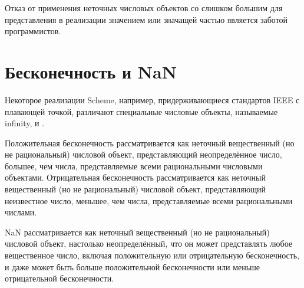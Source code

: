 Отказ от применения неточных числовых объектов со слишком большим для представления в
реализации значением или значащей частью является заботой программистов.\vspace{-6mm}

\section{Бесконечность и NaN}\vspace{-4mm}

Некоторое реализации Scheme, например, придерживающиеся стандартов IEEE с плавающей
точкой, различают специальные числовые объекты, называемые \mainindex
{infinity},  и
.

Положительная бесконечность рассматривается как неточный вещественный (но не рациональный)
числовой объект, представляющий неопределённое число, большее, чем числа, представляемые всеми
рациональными числовыми объектами. Отрицательная бесконечность рассматривается как неточный
вещественный (но не рациональный) числовой объект, представляющий неизвестное число, меньшее,
чем числа, представляемые всеми рациональными числами.

NaN рассматривается как неточный вещественный (но не рациональный) числовой объект, настолько
неопределённый, что он может представлять любое вещественное число, включая положительную или
отрицательную бесконечность, и даже может быть больше положительной бесконечности или
меньше отрицательной бесконечности.\vspace{-5mm}

